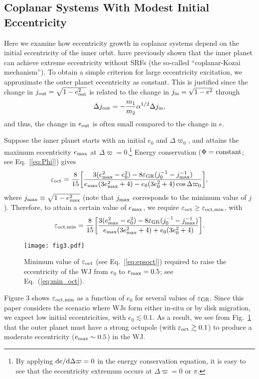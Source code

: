 \documentclass[12pt,useAMS, usenatbib]{mn2e}
\newcommand{\be}{\begin{equation}}
\newcommand{\ee}{\end{equation}}
\newcommand{\Max}{{\rm max}}
\newcommand{\In}{{\rm in}}
\newcommand{\Out}{{\rm out}}
\newcommand{\oct}{{\rm oct}}
\newcommand{\eout}{e_\Out}
\newcommand{\emax}{e_\Max}
\newcommand{\gr}{\rm GR}
\begin{document}
\subsection{Coplanar Systems With Modest Initial Eccentricity}
\label{sec:ecc}
Here we examine how eccentricity growth in coplanar systems depend on the initial eccentricity of the inner orbit.  \cite{li2014} have previously shown that the inner planet can achieve extreme eccentricity without SRFs (the so-called
``coplanar-Kozai mechanism''). To obtain a simple criterion for large eccentricity excitation, we approximate the outer planet eccentricity as constant.  This is justified since the change in $j_\Out = \sqrt{1 - \eout^2}$ is related to the change in $j_\In = \sqrt{1 - e^2}$ through
\be
\Delta j_\Out = - \frac{m_1}{m_2} \alpha^{1/2} \Delta j_\In,
\label{eq:delta_j}
\ee
and thus, the change in $\eout$ is often small compared to the change in $e$.

Suppose the inner planet starts with an initial $e_0$ and $\Delta \varpi_0$, and attains the maximum eccentricity $\emax$ at $\Delta \varpi = 0$.\footnote{By applying ${\rm d} e/{\rm d} \Delta\varpi=0$ in the energy conservation equation, it is easy to see that the eccentricity extremum occurs at $\Delta\varpi= 0$ or $\pi$.}  Energy conservation ($\Phi={\rm constant}$; see Eq.~[\ref{eq:Phi}]) gives
\be
\varepsilon_\oct = \frac{8}{15} \bigg[\frac{3(\emax^2 - e_0^2) - 8 \varepsilon_{\gr} (j_0^{-1} - j_\Max^{-1})}{\emax(3 \emax^2 + 4) - e_0(3 e_0^2 + 4) \cos \Delta \varpi_0 } \bigg],
\label{eq:coplanar_condition}
\ee
where $j_\Max \equiv \sqrt{1 - \emax^2}$ (note that $j_\Max$ corresponds to the minimum value of $j$).  Therefore, to attain a certain value of $\emax$, we require $\varepsilon_{\oct} \geq \varepsilon_{\oct, \rm min}$, with
\be
\varepsilon_{\oct,\rm min} = \frac{8}{15} \bigg[\frac{3(\emax^2 - e_0^2) - 8 \varepsilon_{\gr} (j_0^{-1} - j_\Max^{-1})}{\emax(3 \emax^2 + 4) + e_0(3 e_0^2 + 4)} \bigg].
\label{eq:min_oct}
\ee

\begin{figure}
\centering 
\texttt{[image: fig3.pdf]}
\caption{Minimum value of $\varepsilon_\oct$ (see Eq.~[\ref{eq:epsoct}]) required to raise the eccentricity of the WJ from $e_0$ to $\emax = 0.5$; see Eq.~(\ref{eq:min_oct}).}
\label{fig:min_eps_oct}
\end{figure}

Figure 3 shows $\varepsilon_{\rm oct, min}$ as a function of $e_0$ for several values of $\varepsilon_{\gr}$.  Since this paper considers the scenario where WJs form either in-situ or by disk migration, we expect low initial eccentricities, with $e_0 \lesssim 0.1$.  As a result, we see from Fig.~\ref{fig:min_eps_oct} that the outer planet must have a strong octupole (with $\varepsilon_\oct \gtrsim 0.1$) to produce a moderate eccentricity ($\emax \sim 0.5$) in the WJ.
\end{document}
